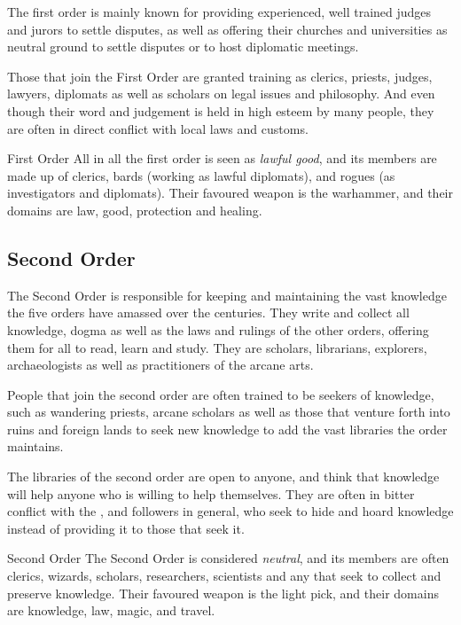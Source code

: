 The first order is mainly known for providing experienced, well trained judges
and jurors to settle disputes, as well as offering their churches and
universities as neutral ground to settle disputes or to host diplomatic
meetings.

Those that join the First Order are granted training as clerics, priests,
judges, lawyers, diplomats as well as scholars on legal issues and
philosophy. And even though their word and judgement is held in high esteem by
many people, they are often in direct conflict with local laws and customs.

\begin{35e}{First Order}
  All in all the first order is seen as \emph{lawful good}, and its members
  are made up of clerics, bards (working as lawful diplomats), and rogues (as
  investigators and diplomats). Their favoured weapon is the warhammer, and
their domains are law, good, protection and healing.
\end{35e}

\subsection{Second Order}
\label{sec:Second Order}

The Second Order is responsible for keeping and maintaining the vast knowledge
the five orders have amassed over the centuries. They write and collect all
knowledge, dogma as well as the laws and rulings of the other orders, offering
them for all to read, learn and study. They are scholars, librarians,
explorers, archaeologists as well as practitioners of the arcane arts.

People that join the second order are often trained to be seekers of
knowledge, such as wandering priests, arcane scholars as well as those that
venture forth into ruins and foreign lands to seek new knowledge to add the
vast libraries the order maintains.

The libraries of the second order are open to anyone, and think that knowledge
will help anyone who is willing to help themselves. They are often in bitter
conflict with the , and 
followers in general, who seek to hide and hoard knowledge instead of
providing it to those that seek it.

\begin{35e}{Second Order}
  The Second Order is considered \emph{neutral}, and its members are often
  clerics, wizards, scholars, researchers, scientists and any that seek to
  collect and preserve knowledge. Their favoured weapon is the light pick,
  and their domains are knowledge, law, magic, and travel.
\end{35e}


